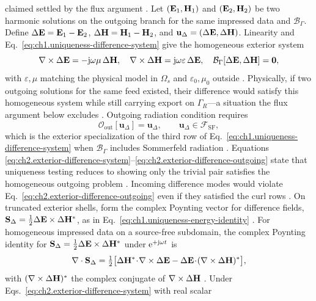 claimed settled by the flux argument \cite{devaney2004}.
Let \((\mathbf{E}_1,\mathbf{H}_1)\) and \((\mathbf{E}_2,\mathbf{H}_2)\) be two harmonic
solutions on the outgoing branch for the same impressed data and \(\mathcal{B}_\Gamma\). Define
\(\Delta\mathbf{E}=\mathbf{E}_1-\mathbf{E}_2\), \(\Delta\mathbf{H}=\mathbf{H}_1-\mathbf{H}_2\), and
\(\mathbf{u}_\Delta=(\Delta\mathbf{E},\Delta\mathbf{H})\). Linearity and
Eq.~\eqref{eq:ch1.uniqueness-difference-system} give the homogeneous exterior system
\begin{equation}
\label{eq:ch2.exterior-difference-system}
\nabla\times\Delta\mathbf{E}=-\mathrm{j}\omega\mu\,\Delta\mathbf{H},\quad
\nabla\times\Delta\mathbf{H}=\mathrm{j}\omega\varepsilon\,\Delta\mathbf{E},\quad
\mathcal{B}_\Gamma[\Delta\mathbf{E},\Delta\mathbf{H}]=\mathbf{0},
\end{equation}
with \(\varepsilon,\mu\) matching the physical model in \(\Omega_s\) and
\(\varepsilon_0,\mu_0\) outside \cite{stratton1941}. Physically, if two outgoing solutions
for the same feed existed, their difference would satisfy this homogeneous system while still
carrying export on $\Gamma_R$---a situation the flux argument below excludes
\cite{stratton1941}. Outgoing radiation condition requires
\begin{equation}
\label{eq:ch2.exterior-difference-outgoing}
\mathcal{O}_{\mathrm{out}}[\mathbf{u}_\Delta]=\mathbf{u}_\Delta,
\qquad
\mathbf{u}_\Delta\in\mathcal{F}_{\mathrm{SF}},
\end{equation}
which is the exterior specialization of the third row of
Eq.~\eqref{eq:ch1.uniqueness-difference-system} when
\(\mathcal{B}_\Gamma\) includes Sommerfeld radiation \cite{harrington2001}. Equations
\eqref{eq:ch2.exterior-difference-system}--\eqref{eq:ch2.exterior-difference-outgoing}
state that uniqueness testing reduces to showing only the trivial pair satisfies the
homogeneous outgoing problem \cite{stratton1941}. Incoming difference modes would
violate Eq.~\eqref{eq:ch2.exterior-difference-outgoing} even if they satisfied the
curl rows \cite{jackson1999}.
On truncated exterior shells, form the complex Poynting vector for difference fields,
\(\mathbf{S}_\Delta=\tfrac12\Delta\mathbf{E}\times\Delta\mathbf{H}^{*}\), as in
Eq.~\eqref{eq:ch1.uniqueness-energy-identity} \cite{stratton1941}. For homogeneous impressed
data on a source-free subdomain, the complex Poynting identity for
$\mathbf{S}_\Delta=\tfrac12\Delta\mathbf{E}\times\Delta\mathbf{H}^{*}$ under $\mathrm{e}^{+\mathrm{j}\omega t}$ is
\[
\nabla\cdot\mathbf{S}_\Delta
=
\tfrac12\big[\Delta\mathbf{H}^{*}\!\cdot\!\nabla\times\Delta\mathbf{E}
-\Delta\mathbf{E}\!\cdot\!(\nabla\times\Delta\mathbf{H})^{*}\big],
\]
with $(\nabla\times\Delta\mathbf{H})^{*}$ the complex conjugate of $\nabla\times\Delta\mathbf{H}$
\cite{stratton1941,jackson1999}.
Under Eqs.~\eqref{eq:ch2.exterior-difference-system} with real scalar
